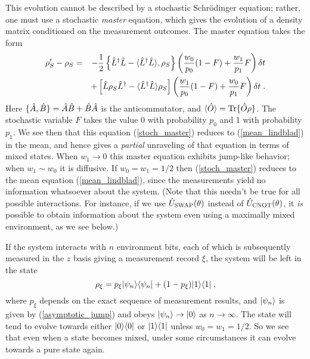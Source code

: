 This evolution cannot be described by a stochastic Schr\"odinger
equation; rather, one must use a stochastic {\it master} equation,
which gives the evolution of a density matrix conditioned on the
measurement outcomes.  The master equation takes the form
\begin{eqnarray}
\rho'_S - \rho_S &=&
  - {1\over2} \left\{ {\hat L^\dagger}{\hat L} - {\langle {\hat L^\dagger}{\hat L} \rangle},\rho_S \right\}
  \left( { w_0\over p_0 } (1-F)
  + {w_1\over p_1} F \right) \delta t \nonumber\\
&& + \left[ {\hat L} \rho_S {\hat L^\dagger} - {\langle {\hat L^\dagger}{\hat L} \rangle}\rho_S \right]
  \left( { w_1\over p_0 } (1-F) + { w_0\over p_1 } F
  \right) \delta t \;.
\label{stoch_master}
\end{eqnarray}
Here $\{{\hat A},{\hat B}\} = {\hat A}{\hat B} + {\hat B}{\hat A}$ is the anticommutator, and
${\langle {\hat O} \rangle} = {\rm Tr}\{{\hat O}\rho\}$.
The stochastic variable $F$ takes the value 0 with probability $p_0$
and 1 with probability $p_1$.  We see then that this equation
(\ref{stoch_master}) reduces to (\ref{mean_lindblad}) in the mean,
and hence gives a {\it partial} unraveling of that equation in terms
of mixed states.  When $w_1 \rightarrow 0$ this master equation exhibits
jump-like behavior; when $w_1 \sim w_0$ it is diffusive.
If $w_0 = w_1 = 1/2$ then (\ref{stoch_master}) reduces to the mean
equation (\ref{mean_lindblad}), since the measurements yield no information
whatsoever about the system.  (Note that this needn't be true for all
possible interactions.  For instance, if we use ${\hat U}_{\rm SWAP}(\theta)$
instead of ${\hat U}_{\rm CNOT}(\theta)$, it {\it is} possible to obtain
information about the system even using a maximally mixed environment,
as we see below.)

If the system interacts with $n$ environment bits, each of which is
subsequently measured in the $z$ basis giving a measurement record $\xi$,
the system will be left in the state
\begin{equation}
\rho_\xi = p_\xi {| \psi_n \rangle}{\langle \psi_n |} + (1-p_\xi){| 1 \rangle}{\langle 1 |} \;,
\label{rho_xi}
\end{equation}
where $p_\xi$ depends on the exact sequence of measurement results, and
${| \psi_n \rangle}$ is given by (\ref{asymptotic_jump}) and obeys
${| \psi_n \rangle}\rightarrow{| 0 \rangle}$ as $n\rightarrow\infty$.  The state will
tend to evolve towards either ${| 0 \rangle}{\langle 0 |}$ or ${| 1 \rangle}{\langle 1 |}$ unless
$w_0=w_1=1/2$.  So we see that even when a state becomes mixed, under some
circumstances it can evolve towards a pure state again.

